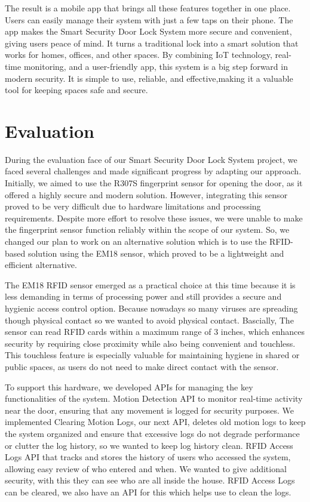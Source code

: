 \documentclass[USenglish,oneside,twocolumn]{article}
\begin{document}
The result is a mobile app that brings all these features together in one place. Users can easily manage their system with just a few taps on their phone. The app makes the Smart Security Door Lock System more secure and convenient, giving users peace of mind. It turns a traditional lock into a smart solution that works for homes, offices, and other spaces. By combining IoT technology, real-time monitoring, and a user-friendly app, this system is a big step forward in modern security. It is simple to use, reliable, and effective,making it a valuable tool for keeping spaces safe and secure.

\section{Evaluation}
\label{sec:Evaluation}
During the evaluation face of our Smart Security Door Lock System project, we faced several challenges and made significant progress by adapting our approach. Initially, we aimed to use the R307S fingerprint sensor for opening the door, as it offered a highly secure and modern solution. However, integrating this sensor proved to be very difficult due to hardware limitations and processing requirements. Despite more effort to resolve these issues, we were unable to make the fingerprint sensor function reliably within the scope of our system. So, we changed our plan to work on an alternative solution which is to use the RFID-based solution using the EM18 sensor, which proved to be a lightweight and efficient alternative.

The EM18 RFID sensor emerged as a practical choice at this time because it is less demanding in terms of processing power and still provides a secure and hygienic access control option. Because nowadays so many viruses are spreading though physical contact so we wanted to avoid physical contact. Bascially, The sensor can read RFID cards within a maximum range of 3 inches, which enhances security by requiring close proximity while also being convenient and touchless. This touchless feature is especially valuable for maintaining hygiene in shared or public spaces, as users do not need to make direct contact with the sensor. 

To support this hardware, we developed APIs for managing the key functionalities of the system.
Motion Detection API to monitor real-time activity near the door, ensuring that any movement is logged for security purposes. We implemented Clearing Motion Logs, our next API, deletes old motion logs to keep the system organized and ensure that excessive logs do not degrade performance or clutter the log history, so we wanted to keep log history clean.
RFID Access Logs API that tracks and stores the history of users who accessed the system, allowing easy review of who entered and when. We wanted to give additional security,  with this they can see who are all inside the house. RFID Access Logs can be cleared, we also have an API for this which helps use to clean the logs.
\end{document}
